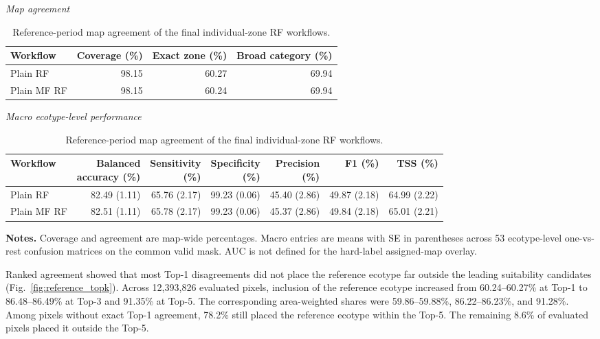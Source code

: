 \documentclass[11pt]{article}
\begin{document}
\begin{table}[!htbp]
\centering
\caption{Reference-period map agreement of the final individual-zone RF workflows.}
\label{tab:reference_map_final}
\begin{threeparttable}
\centering
\scriptsize

\textit{Map agreement}\\[-0.2em]
\setlength{\tabcolsep}{6pt}
\begin{tabular}{@{}lrrr@{}}
\toprule
Workflow & Coverage (\%) & Exact zone (\%) & Broad category (\%) \\
\midrule
Plain RF    & 98.15 & 60.27 & 69.94 \\
Plain MF RF & 98.15 & 60.24 & 69.94 \\
\bottomrule
\end{tabular}

\vspace{0.6em}

\textit{Macro ecotype-level performance}\\[-0.2em]
\setlength{\tabcolsep}{2.7pt}
\begin{tabular}{@{}lrrrrrr@{}}
\toprule
Workflow &
\shortstack{Balanced\\accuracy (\%)} &
\shortstack{Sensitivity\\(\%)} &
\shortstack{Specificity\\(\%)} &
\shortstack{Precision\\(\%)} &
F1 (\%) &
TSS (\%) \\
\midrule
Plain RF    & 82.49 (1.11) & 65.76 (2.17) & 99.23 (0.06) & 45.40 (2.86) & 49.87 (2.18) & 64.99 (2.22) \\
Plain MF RF & 82.51 (1.11) & 65.78 (2.17) & 99.23 (0.06) & 45.37 (2.86) & 49.84 (2.18) & 65.01 (2.21) \\
\bottomrule
\end{tabular}

\begin{tablenotes}[flushleft]
\footnotesize
\item[] \textbf{Notes.} Coverage and agreement are map-wide percentages.
Macro entries are means with SE in parentheses across 53 ecotype-level
one-vs-rest confusion matrices on the common valid mask. AUC is not defined
for the hard-label assigned-map overlay.
\end{tablenotes}
\end{threeparttable}
\end{table}

Ranked agreement showed that most Top-1 disagreements did not place the
reference ecotype far outside the leading suitability candidates
(Fig.~\ref{fig:reference_topk}). Across 12,393,826 evaluated pixels, inclusion
of the reference ecotype increased from 60.24--60.27\% at Top-1 to
86.48--86.49\% at Top-3 and 91.35\% at Top-5. The corresponding area-weighted
shares were 59.86--59.88\%, 86.22--86.23\%, and 91.28\%. Among pixels without
exact Top-1 agreement, 78.2\% still placed the reference ecotype within the
Top-5. The remaining 8.6\% of evaluated pixels placed it outside the Top-5.
\end{document}
